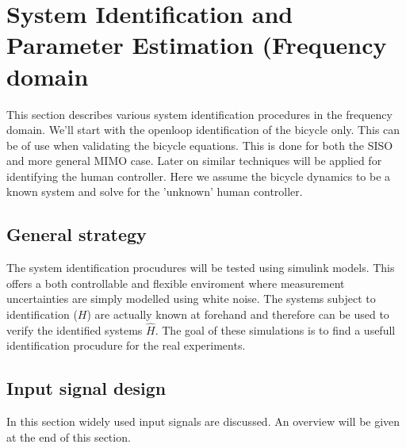 \chapter{System Identification and Parameter Estimation (Frequency domain}
This section describes various system identification procedures in the frequency domain. We'll start with the openloop identification of the bicycle only. This can be of use when validating the bicycle equations. This is done for both the SISO and more general MIMO case. Later on similar techniques will be applied for identifying the human controller. Here we assume the bicycle dynamics to be  a known system and solve for the 'unknown' human controller.

\section{General strategy}
The system identification procudures will be tested using simulink models. This offers a both controllable and flexible enviroment where measurement uncertainties are simply modelled using white noise. The systems subject to identification ($H$) are actually known at forehand and therefore can be used to verify the identified systems $\hat{H}$. The goal of these simulations is to find a usefull identification procudure for the real experiments. 

\section{Input signal design}
In this section widely used input signals are discussed. An overview will be given at the end of this section.
